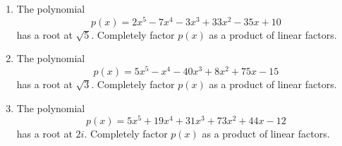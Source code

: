 \documentclass{article}
\begin{document}
\ActivityTitle[class={College Algebra}, number={5}, name={Polynomials 3}]

\begin{enumerate}
\item The polynomial \[ p(x) = 2x^5 - 7x^4 - 3x^3 + 33x^2 - 35x + 10 \] has a root at $\sqrt{5}$. Completely factor $p(x)$ as a product of linear factors. \vspace{7cm}

\newpage

\item The polynomial \[ p(x) = 5x^5 - x^4 - 40x^3 + 8x^2 + 75x - 15 \] has a root at $\sqrt{3}$. Completely factor $p(x)$ as a product of linear factors. \vspace{7cm}

\newpage

\item The polynomial \[ p(x) = 5x^5 + 19x^4 + 31x^3 + 73x^2 + 44x - 12 \] has a root at $2i$. Completely factor $p(x)$ as a product of linear factors. \vspace{7cm}

\end{enumerate}
\end{document}
